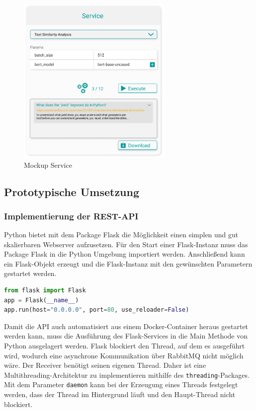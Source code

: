\begin{figure}[H]
  \centering
    \includegraphics[width = 7.5cm]{bilder/mockupService}
    \caption{Mockup Service}
\end{figure}

\subsection{Prototypische Umsetzung}
\subsubsection{Implementierung der REST-API}
Python bietet mit dem Package Flask die Möglichkeit einen simplen und gut skalierbaren Webserver aufzusetzen. Für den Start einer Flask-Instanz muss das Package Flask in die Python Umgebung importiert werden. Anschließend kann ein Flask-Objekt erzeugt und die Flask-Instanz mit den gewünschten Parametern gestartet werden.

\begin{lstlisting}[language=Python, caption={Aufsetzen einer Flask-Instanz}]
from flask import Flask
app = Flask(__name__)
app.run(host="0.0.0.0", port=80, use_reloader=False)
\end{lstlisting}

Damit die API auch automatisiert aus einem Docker-Container heraus gestartet werden kann, muss die Ausführung des Flask-Services in die Main Methode von Python ausgelagert werden. Flask blockiert den Thread, auf dem es ausgeführt wird, wodurch eine asynchrone Kommunikation über RabbitMQ nicht möglich wäre. Der Receiver benötigt seinen eigenen Thread. Daher ist eine Multithreading-Architektur zu implementieren mithilfe des \texttt{threading}-Packages. Mit dem Parameter \texttt{daemon} kann bei der Erzeugung eines Threads festgelegt werden, dass der Thread im Hintergrund läuft und den Haupt-Thread nicht blockiert.

